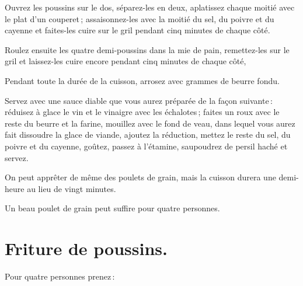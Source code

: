 Ouvrez les poussins sur le dos, séparez-les en deux, aplatissez chaque moitié
avec le plat d'un couperet ; assaisonnez-les avec la moitié du sel, du poivre
et du cayenne et faites-les cuire sur le gril pendant cinq minutes de chaque
côté.

Roulez ensuite les quatre demi-poussins dans la mie de pain, remettez-les sur
le gril et laissez-les cuire encore pendant cinq minutes de chaque côté,

Pendant toute la durée de la cuisson, arrosez avec {\mmm} grammes de beurre fondu.

Servez avec une sauce diable que vous aurez préparée de la façon suivante :
réduisez à glace le vin et le vinaigre avec les échalotes ; faites un roux avec
le reste du beurre et la farine, mouillez avec le fond de veau, dans lequel
vous aurez fait dissoudre la glace de viande, ajoutez la réduction, mettez le
reste du sel, du poivre et du cayenne, goûtez, passez à l'étamine, saupoudrez
de persil haché et servez.

\sk

On peut apprêter de même des poulets de grain, mais la cuisson durera une
demi-heure au lieu de vingt minutes.

Un beau poulet de grain peut suffire pour quatre personnes.

\section*{\centering Friture de poussins.}
{}

Pour quatre personnes prenez :

\medskip

